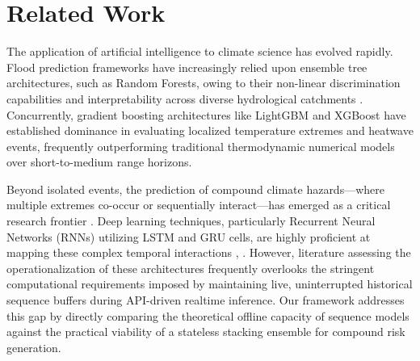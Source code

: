 \section{Related Work}
\label{sec:related_work}
The application of artificial intelligence to climate science has evolved rapidly. Flood prediction frameworks have increasingly relied upon ensemble tree architectures, such as Random Forests, owing to their non-linear discrimination capabilities and interpretability across diverse hydrological catchments \cite{Mosavi2018}. Concurrently, gradient boosting architectures like LightGBM \cite{Ke2017} and XGBoost \cite{Chen2016} have established dominance in evaluating localized temperature extremes and heatwave events, frequently outperforming traditional thermodynamic numerical models over short-to-medium range horizons.

Beyond isolated events, the prediction of compound climate hazards---where multiple extremes co-occur or sequentially interact---has emerged as a critical research frontier \cite{Zscheischler2018}. Deep learning techniques, particularly Recurrent Neural Networks (RNNs) utilizing LSTM and GRU cells, are highly proficient at mapping these complex temporal interactions \cite{Chattopadhyay2020}, \cite{Cho2014}. However, literature assessing the operationalization of these architectures frequently overlooks the stringent computational requirements imposed by maintaining live, uninterrupted historical sequence buffers during API-driven realtime inference. Our framework addresses this gap by directly comparing the theoretical offline capacity of sequence models against the practical viability of a stateless stacking ensemble for compound risk generation.
